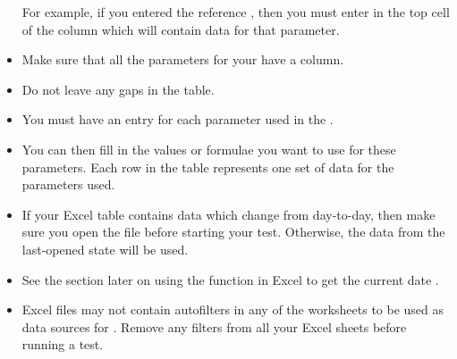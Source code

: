 \begin{itemize}
For example, if you entered the reference , then you must enter  in the top cell of the column which will contain data for that parameter. 
\item Make sure that all the parameters for your \gdcase{} have a column.
\item Do not leave any gaps in the table.
\item You must have an entry for each parameter used in the \gdcase{}. 
\item You can then fill in the values or formulae you want to use for these parameters. Each row in the table represents one set of data for the parameters used. 
\item If your Excel table contains data which change from day-to-day, then make sure you open the file before starting your test. Otherwise, the data from the last-opened state will be used.
\item See the section later on using the  function in Excel to get the current date . 
\item Excel files may not contain autofilters in any of the worksheets to be used as data sources for \gd{}. Remove any filters from all your Excel sheets before running a test. 
\end{itemize}

